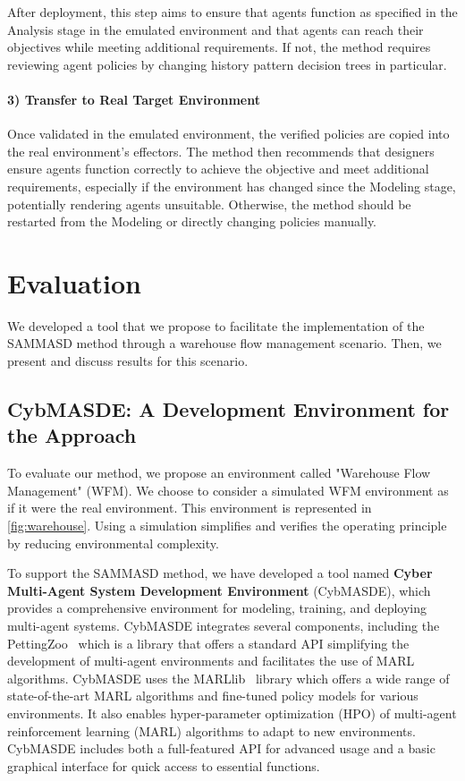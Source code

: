 \documentclass[sigconf,anonymous]{aamas}
\begin{document}
After deployment, this step aims to ensure that agents function as specified in the Analysis stage in the emulated environment and that agents can reach their objectives while meeting additional requirements. If not, the method requires reviewing agent policies by changing history pattern decision trees in particular.

\paragraph{\textbf{3) Transfer to Real Target Environment}}

Once validated in the emulated environment, the verified policies are copied into the real environment's effectors. The method then recommends that designers ensure agents function correctly to achieve the objective and meet additional requirements, especially if the environment has changed since the Modeling stage, potentially rendering agents unsuitable. Otherwise, the method should be restarted from the Modeling or directly changing policies manually.

\section{Evaluation}
\label{sec:evaluation}

We developed a tool that we propose to facilitate the implementation of the SAMMASD method through a warehouse flow management scenario. Then, we present and discuss results for this scenario.

\subsection{CybMASDE: A Development Environment for the Approach}

To evaluate our method, we propose an environment called "Warehouse Flow Management" (WFM). We choose to consider a simulated WFM environment as if it were the real environment. This environment is represented in \autoref{fig:warehouse}.
Using a simulation simplifies and verifies the operating principle by reducing environmental complexity.

To support the SAMMASD method, we have developed a tool named \textbf{Cyber Multi-Agent System Development Environment} (CybMASDE), which provides a comprehensive environment for modeling, training, and deploying multi-agent systems. CybMASDE integrates several components, including the PettingZoo~\cite{Terry2021} which is a library that offers a standard API simplifying the development of multi-agent environments and facilitates the use of MARL algorithms. CybMASDE uses the MARLlib~\cite{hu2022marllib} library which offers a wide range of state-of-the-art MARL algorithms and fine-tuned policy models for various environments. It also enables hyper-parameter optimization (HPO) of multi-agent reinforcement learning (MARL) algorithms to adapt to new environments. CybMASDE includes both a full-featured API for advanced usage and a basic graphical interface for quick access to essential functions.
\end{document}
